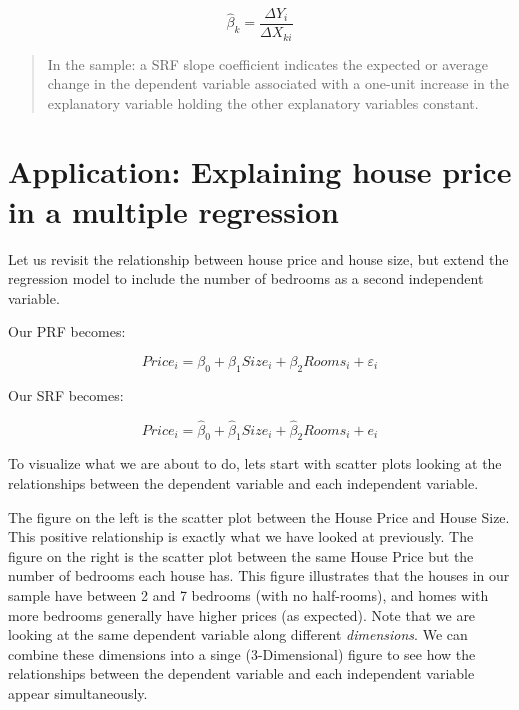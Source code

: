 \documentclass[
]{book}
\begin{document}
\[\hat{\beta}_k=\frac{\Delta Y_i}{\Delta X_{ki}}\]

\begin{quote}
In the sample: a SRF slope coefficient indicates the expected or average change in the dependent variable associated with a one-unit increase in the explanatory variable holding the other explanatory variables constant.
\end{quote}

\hypertarget{application-explaining-house-price-in-a-multiple-regression}{%
\section{Application: Explaining house price in a multiple regression}\label{application-explaining-house-price-in-a-multiple-regression}}

Let us revisit the relationship between house price and house size, but extend the regression model to include the number of bedrooms as a second independent variable.

Our PRF becomes:

\[Price_i=\beta_0+\beta_1Size_i+\beta_2Rooms_i+\varepsilon_i\]

Our SRF becomes:

\[Price_i=\hat{\beta}_0+\hat{\beta}_1Size_i+\hat{\beta}_2Rooms_i+e_i\]

To visualize what we are about to do, lets start with scatter plots looking at the relationships between the dependent variable and each independent variable.

The figure on the left is the scatter plot between the House Price and House Size. This positive relationship is exactly what we have looked at previously. The figure on the right is the scatter plot between the same House Price but the number of bedrooms each house has. This figure illustrates that the houses in our sample have between 2 and 7 bedrooms (with no half-rooms), and homes with more bedrooms generally have higher prices (as expected). Note that we are looking at the same dependent variable along different \emph{dimensions}. We can combine these dimensions into a singe (3-Dimensional) figure to see how the relationships between the dependent variable and each independent variable appear simultaneously.
\end{document}
